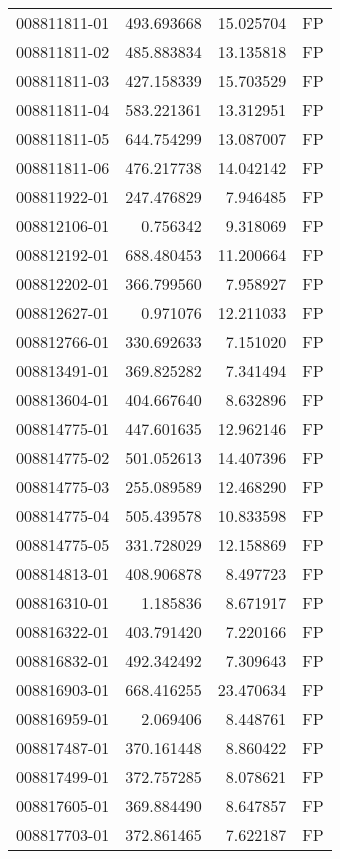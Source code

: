 \begin{tabular}{lrrl}
008811811-01 &  493.693668 &    15.025704 &   FP \\
008811811-02 &  485.883834 &    13.135818 &   FP \\
008811811-03 &  427.158339 &    15.703529 &   FP \\
008811811-04 &  583.221361 &    13.312951 &   FP \\
008811811-05 &  644.754299 &    13.087007 &   FP \\
008811811-06 &  476.217738 &    14.042142 &   FP \\
008811922-01 &  247.476829 &     7.946485 &   FP \\
008812106-01 &    0.756342 &     9.318069 &   FP \\
008812192-01 &  688.480453 &    11.200664 &   FP \\
008812202-01 &  366.799560 &     7.958927 &   FP \\
008812627-01 &    0.971076 &    12.211033 &   FP \\
008812766-01 &  330.692633 &     7.151020 &   FP \\
008813491-01 &  369.825282 &     7.341494 &   FP \\
008813604-01 &  404.667640 &     8.632896 &   FP \\
008814775-01 &  447.601635 &    12.962146 &   FP \\
008814775-02 &  501.052613 &    14.407396 &   FP \\
008814775-03 &  255.089589 &    12.468290 &   FP \\
008814775-04 &  505.439578 &    10.833598 &   FP \\
008814775-05 &  331.728029 &    12.158869 &   FP \\
008814813-01 &  408.906878 &     8.497723 &   FP \\
008816310-01 &    1.185836 &     8.671917 &   FP \\
008816322-01 &  403.791420 &     7.220166 &   FP \\
008816832-01 &  492.342492 &     7.309643 &   FP \\
008816903-01 &  668.416255 &    23.470634 &   FP \\
008816959-01 &    2.069406 &     8.448761 &   FP \\
008817487-01 &  370.161448 &     8.860422 &   FP \\
008817499-01 &  372.757285 &     8.078621 &   FP \\
008817605-01 &  369.884490 &     8.647857 &   FP \\
008817703-01 &  372.861465 &     7.622187 &   FP \\

\end{tabular}
